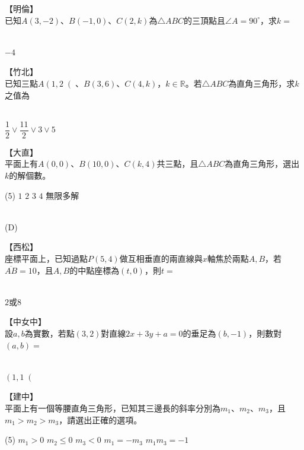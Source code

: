 \documentclass
[answers]
{exam}
\newcommand\ul[1]{\uline{\hspace*{#1}}}
\theoremstyle{definition}
\begin{document}
\begin{questions}
\question
【明倫】\\
已知$A\left(3,-2\right)$、$B\left(-1,0 \right)$、$C\left( 2,k \right)$為$\triangle ABC $的三頂點且$ \angle A = 90^{\circ}$，求$k=$\ul{50pt}
\begin{solution}~\\
	$-4$
\end{solution}

\question
【竹北】\\
已知三點$A\left( 1,2\right($、$B\left( 3,6 \right)$、$C\left(4,k\right)$，$k\in \mathbb{R}$。若$\triangle ABC$為直角三角形，求$k$之值為\ul{50pt}
\begin{solution}~\\
	$\dfrac{1}{2}  \vee \dfrac{11}{2} \vee 3 \vee 5$
\end{solution}

\question
【大直】\\
平面上有$A\left(0,0\right)$、$B\left( 10,0\right)$、$C\left( k,4\right)$共三點，且$\triangle ABC$為直角三角形，選出$k$的解個數。
\begin{tasks}(5)
	\task $1$
	\task $2$
	\task $3$
	\task $4$
	\task 無限多解
\end{tasks}

\begin{solution}~\\
	(D)
\end{solution}


\question
【西松】\\
座標平面上，已知過點$P\left( 5,4\right)$做互相垂直的兩直線與$x$軸焦於兩點$A,B$，若$\overline{AB}=10$，且$A,B$的中點座標為$\left( t,0 \right)$，則$t=$\ul{50pt}
\begin{solution}~\\
	$2$或$8$
\end{solution}

\question
【中女中】\\
設$a,b$為實數，若點$\left( 3,2\right)$對直線$2x+3y+a=0$的垂足為$\left( b,-1 \right)$，則數對$\left( a,b\right) = $\ul{50pt}
\begin{solution}~\\
	$\left( 1,1 \right($
\end{solution}

\question
【建中】\\
平面上有一個等腰直角三角形，已知其三邊長的斜率分別為$m_1$、$m_2$、$m_3$，且$m_1>m_2>m_3$，請選出正確的選項。

\begin{tasks}(5)
	\task $m_1 > 0$
	\task $m_2 \leq 0$
	\task $m_3 < 0$
	\task $m_1 = -m_3$
	\task $m_1m_3=-1$
\end{tasks}


\end{questions}
\end{document}
